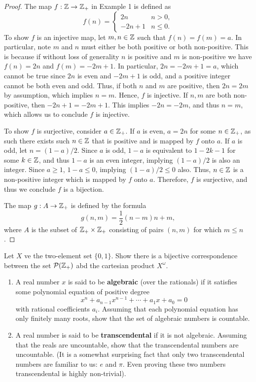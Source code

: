 \documentclass[12pt]{article}
\begin{document}
	\begin{proof}
		The map $f: \mathbb{Z} \to \mathbb{Z}_{+}$ in Example 1 is defined as 
		$$
		f(n) = 
		\begin{cases}
			2n & n > 0, \\
			-2n + 1 & n \leq 0.
		\end{cases}
		$$
		To show $f$ is an injective map, let $m, n \in \mathbb{Z}$ such
		that $f(n) = f(m) = a$. In particular, note $m$ and 
		$n$ must either be both positive or both non-positive. This is 
		because if without loss of generality $n$ is positive and $m$
		is non-positive we have $f(n) = 2n$ and $f(m) = -2m + 1$. 
		In particular, $2n = -2m + 1 = a$, which cannot be true
		since $2n$ is even and $-2m + 1$ is odd, and a positive integer
		cannot be both even and odd. Thus, if both $n$ and $m$ are positive,
		then $2n = 2m$ by assumption, which implies $n = m$.
		Hence, $f$ is injective. If $n, m$ are both non-positive,
		then $-2n + 1 = -2m + 1$. This implies $-2n = -2m$, and 
		thus $n = m$, which allows us to conclude $f$ is injective.

		To show $f$ is surjective, consider $a \in \mathbb{Z}_{+}$. If 
		$a$ is even, $a = 2n$ for some $n \in \mathbb{Z}_{+}$, 
		as such there exists such $n \in \mathbb{Z}$ that is positive and is 
		mapped by $f$ onto $a$. If $a$ is odd, let $n = (1 - a)/2$.
		Since $a$ is odd, $1 - a$ is equivalent to $1 - 2k - 1$ for 
		some $k \in \mathbb{Z}$, and thus $1 - a$ is an even integer,
		implying $(1 - a)/2$ is also an integer. Since $a \geq 1$,
		$1 - a \leq 0$, implying $(1-a)/2 \leq 0$ also. Thus,
		$n \in \mathbb{Z}$ is a non-positive integer which is mapped by $f$
		onto $a$. Therefore, $f$ is surjective, and thus we conclude 
		$f$ is a bijection.

		The map $g: A \to \mathbb{Z}_{+}$ is defined 
		by the formula
		$$
		g(n, m) = \frac{1}{2}(n - m)n + m,
		$$
		where $A$ is the  subset of $\mathbb{Z}_{+} \times \mathbb{Z}_{+}$ consisting
		of pairs $(n, m)$ for which $m \leq n$.  
	\end{proof}

	 Let $X$ ve the two-element set $\{0, 1\}$. Show there is 
	a bijective correspondence between the set $\mathcal{P}(\mathbb{Z}_{+})$ abd the 
	cartesian product $X^\omega$.

	\begin{enumerate}[label=(\alph*)]
		\item A real number $x$ is said to be \textbf{algebraic} 
		(over the rationals) if it satisfies some polynomial equation 
		of positive degree 
		$$
		x^n + a_{n - 1}x^{n - 1} + \cdots + a_1 x + a_0 = 0
		$$
		with rational coefficients $a_i$. Assuming that each polynomial
		equation has only finitely many roots, show that the set 
		of algebraic numbers is countable. 
		\item A real number is said to be \textbf{transcendental} if it is 
		not algebraic. Assuming that the reals are uncountable, show that 
		the transcendental numbers are uncountable. (It is a somewhat 
		surprising fact that only two transcendental numbers are familiar
		to us: $e$ and $\pi$. Even proving these two numbers transcendental
		is highly non-trivial).
	\end{enumerate}
\end{document}
